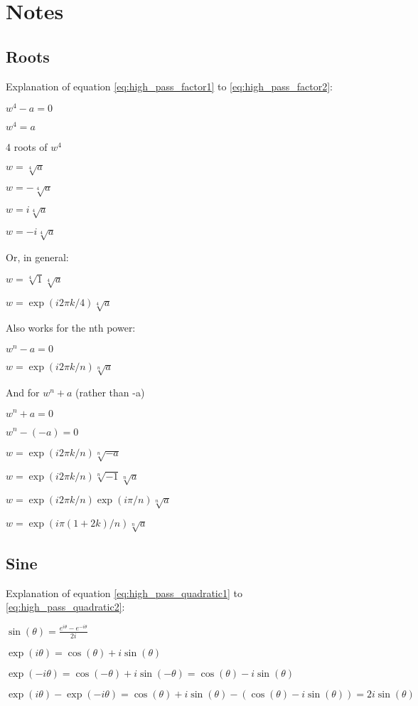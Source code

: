 \documentclass[a4paper]{article}
\begin{document}
\section{Notes}
\subsection{Roots}
\label{roots}
Explanation of equation \ref{eq:high_pass_factor1} to \ref{eq:high_pass_factor2}:

$w^4 - a = 0$

$w^4 = a$

4 roots of $w^4$

$w = \sqrt[4]{a}$

$w = -\sqrt[4]{a}$

$w = i\sqrt[4]{a}$

$w = -i\sqrt[4]{a}$

Or, in general:

$w = \sqrt[4]{1}\sqrt[4]{a}$

$w = \exp(i 2 \pi k/4)\sqrt[4]{a}$

Also works for the nth power:

$w^n - a = 0$

$w = \exp(i 2 \pi k/n)\sqrt[n]{a}$

And for $w^n + a$ (rather than -a)

$w^n + a = 0$

$w^n - (-a) = 0$

$w = \exp(i 2 \pi k/n)\sqrt[n]{-a}$

$w = \exp(i 2 \pi k/n)\sqrt[n]{-1}\sqrt[n]{a}$

$w = \exp(i 2 \pi k/n)\exp(i \pi/n) \sqrt[n]{a}$

$w = \exp(i \pi (1 + 2 k)/n)\sqrt[n]{a}$

\subsection{Sine}
\label{sin}
Explanation of equation \ref{eq:high_pass_quadratic1} to \ref{eq:high_pass_quadratic2}:

$\sin(\theta) = \frac{e^{i \theta} - e^{-i\theta}}{2 i}$

$\exp(i\theta) = \cos(\theta) + i \sin(\theta)$

$\exp(-i\theta) = \cos(-\theta) + i \sin(-\theta)
= \cos(\theta) - i \sin(\theta)$

$\exp(i\theta) - \exp(-i\theta) = \cos(\theta) + i \sin(\theta) - (\cos(\theta) - i \sin(\theta)) = 2 i \sin(\theta)$
\end{document}
